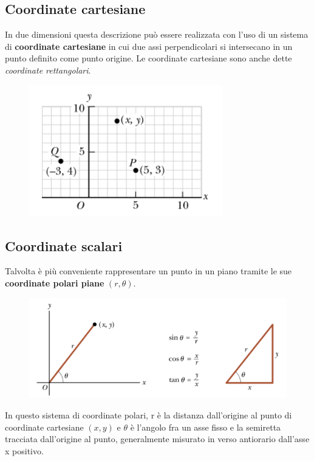 \documentclass[12pt,oneside]{book}
\begin{document}
\subsection{Coordinate cartesiane}
In due dimensioni questa descrizione può essere realizzata con l’uso di un sistema di \textbf{coordinate cartesiane}
in cui due assi perpendicolari si intersecano in un punto definito come punto origine.
Le coordinate cartesiane sono anche dette \emph{coordinate rettangolari}.
\begin{figure}[h]
    \includegraphics[scale=0.5]{coordinate_cartesiane}
    \centering
\end{figure}

\subsection{Coordinate scalari}
Talvolta è più conveniente rappresentare un punto in un piano tramite le sue \textbf{coordinate polari piane} $(r, \theta)$.

\begin{figure}[h]
    \includegraphics[scale=0.5]{coordinate_polari}
    \centering
\end{figure}
In questo sistema di coordinate polari, r è la distanza dall’origine al punto di coordinate
cartesiane $(x, y)$ e $\theta$ è l’angolo fra un asse fisso e la semiretta tracciata dall’origine al punto, generalmente
misurato in verso antiorario dall’asse x positivo.
\end{document}
